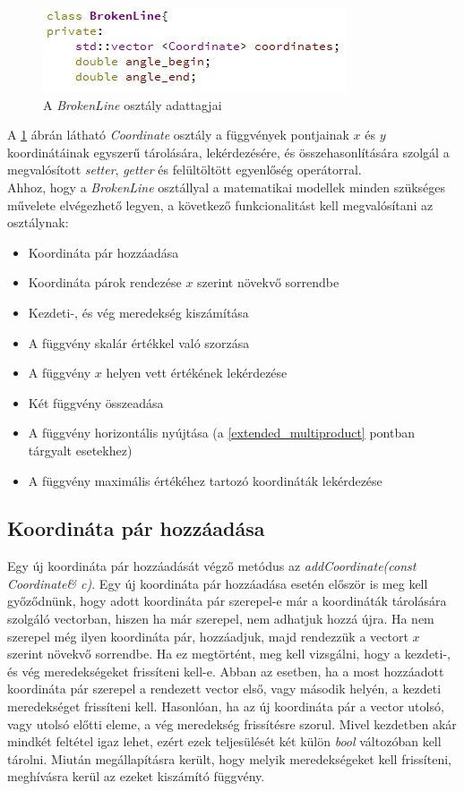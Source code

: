 \documentclass [12pt]{report}
\begin{document}
\begin{figure}[H]
\begin{center}
\includegraphics[scale=1]{broken_line_variables}
\caption{A \textit{BrokenLine} osztály adattagjai}
\label{broken_line_variables}
\end{center}
\end{figure} 
A \ref{broken_line_variables} ábrán látható \textit{Coordinate} osztály a függvények pontjainak $x$ és $y$ koordinátáinak egyszerű tárolására, lekérdezésére, és összehasonlítására szolgál a megvalósított \textit{setter}, \textit{getter} és felültöltött egyenlőség operátorral.\\
Ahhoz, hogy a \textit{BrokenLine} osztállyal a matematikai modellek minden szükséges művelete elvégezhető legyen, a következő funkcionalitást kell megvalósítani az osztálynak:
\begin{itemize}
\item Koordináta pár hozzáadása
\item Koordináta párok rendezése $x$ szerint növekvő sorrendbe
\item Kezdeti-, és vég meredekség kiszámítása
\item A függvény skalár értékkel való szorzása
\item A függvény $x$ helyen vett értékének lekérdezése
\item Két függvény összeadása
\item A függvény horizontális nyújtása (a \ref{extended_multiproduct} pontban tárgyalt esetekhez)
\item A függvény maximális értékéhez tartozó koordináták lekérdezése
\end{itemize} 
\subsection{Koordináta pár hozzáadása} \label{addCoordinates}
Egy új koordináta pár hozzáadását végző metódus az \textit{addCoordinate(const Coordinate\& c)}. Egy új koordináta pár hozzáadása esetén először is meg kell győződnünk, hogy adott koordináta pár szerepel-e már a koordináták tárolására szolgáló vectorban, hiszen ha már szerepel, nem adhatjuk hozzá újra. Ha nem szerepel még ilyen koordináta pár, hozzáadjuk, majd rendezzük a vectort $x$ szerint növekvő sorrendbe. Ha ez megtörtént, meg kell vizsgálni, hogy a kezdeti-, és vég meredekségeket frissíteni kell-e. Abban az esetben, ha a most hozzáadott koordináta pár szerepel a rendezett vector első, vagy második helyén, a kezdeti meredekséget frissíteni kell. Hasonlóan, ha az új koordináta pár a vector utolsó, vagy utolsó előtti eleme, a vég meredekség frissítésre szorul. Mivel kezdetben akár mindkét feltétel igaz lehet, ezért ezek teljesülését két külön \textit{bool} változóban kell tárolni. Miután megállapításra került, hogy melyik meredekségeket kell frissíteni, meghívásra kerül az ezeket kiszámító függvény. 
\end{document}
